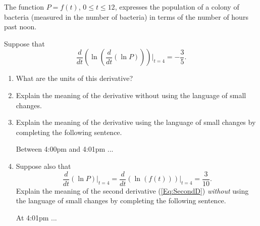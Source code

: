 \documentclass{ximera}
\begin{document}
\begin{question}  \label{Q54356dfdfgng}
The function $P=f(t)$, $0\leq t \leq 12$, expresses the population of a colony of bacteria (measured in the number of bacteria) in terms of the number of hours past noon.

Suppose that
\begin{equation}
   \frac{d}{dt} \left( \ln \left(  \frac{d}{dt} \left( \ln P \right)  \right) \right) \Big|_{t=4} =  -\frac{3}{5} .  \label{Eq:SecondD}
\end{equation}


\begin{enumerate}
\item What are the units of this derivative?

\item Explain the meaning of the derivative without using the language of small changes.

\item Explain the meaning of the derivative using the language of small changes by completing the following sentence.

Between 4:00pm and 4:01pm  ...

\item Suppose also that
\[
   \frac{d}{dt} \left(  \ln P \right)\Big|_{t=4} = \frac{d}{dt} \left(  \ln (f(t)) \right)\Big|_{t=4}  = \frac{3}{10} .
\]
Explain the meaning of the second derivative (\ref{Eq:SecondD}) \emph{without} using the language of small changes by completing the following sentence.

At 4:01pm  ...

\end{enumerate}
\end{question}
\end{document}
